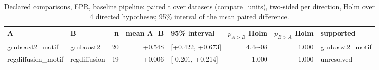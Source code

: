 \begin{table}[H]\centering\small
\caption{Declared comparisons, EPR, baseline pipeline: paired t over datasets (compare\_units), two-sided per direction, Holm over 4 directed hypotheses; 95\% interval of the mean paired difference.}
\begin{tabular}{llrrlrrl}\toprule
A & B & n & mean A$-$B & 95\% interval & $p_{A>B}$ Holm & $p_{B>A}$ Holm & supported \\ \midrule
grnboost2\_motif & grnboost2 & 20 & +0.548 & [+0.422, +0.673] & 4.4e-08 & 1.000 & grnboost2\_motif \\
regdiffusion\_motif & regdiffusion & 19 & +0.006 & [-0.201, +0.214] & 1.000 & 1.000 & unresolved \\
\bottomrule\end{tabular}\end{table}
